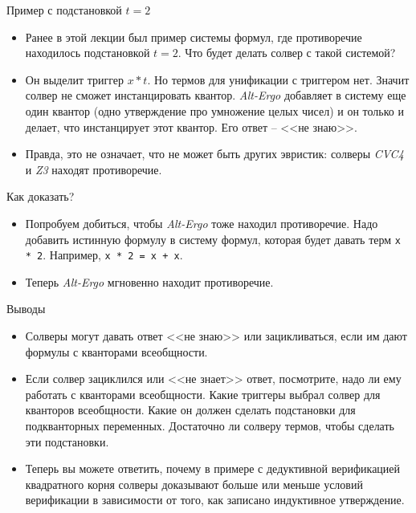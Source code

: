 \documentclass[hyperref={unicode=true}]{beamer}
\begin{document}
    \begin{frame}{Пример с подстановкой $t = 2$}
    \begin{itemize}
    \item
    Ранее в этой лекции был пример системы формул, где противоречие
    находилось подстановкой $t = 2$. Что будет делать солвер с такой системой?
    \item
    Он выделит триггер $x * t$. Но термов для унификации с триггером нет.
    Значит солвер не сможет инстанцировать квантор. \textsl{Alt-Ergo}
    добавляет в систему еще один квантор (одно утверждение про умножение
    целых чисел) и он только и делает, что инстанцирует этот квантор. Его
    ответ -- <<не знаю>>.
    \item
    Правда, это не означает, что не может быть других эвристик: солверы
    \textsl{CVC4} и \textsl{Z3} находят противоречие.
    \end{itemize}
    \end{frame}

    \begin{frame}{Как доказать?}
    \begin{itemize}
    \item
    Попробуем добиться, чтобы \textsl{Alt-Ergo} тоже находил противоречие.
    Надо добавить истинную формулу в систему формул, которая будет давать
    терм \texttt{x * 2}. Например, \texttt{x * 2 = x + x}.
    \item
    Теперь \textsl{Alt-Ergo} мгновенно находит противоречие.
    \end{itemize}
    \end{frame}

    \begin{frame}{Выводы}
    \begin{itemize}
    \item
    Солверы могут давать ответ <<не знаю>> или зацикливаться, если
    им дают формулы с кванторами всеобщности.
    \item
    Если солвер зациклился или <<не знает>> ответ, посмотрите,
    надо ли ему работать с кванторами всеобщности. Какие триггеры выбрал
    солвер для кванторов всеобщности. Какие он должен сделать подстановки
    для подкванторных переменных. Достаточно ли солверу термов, чтобы
    сделать эти подстановки.
    \item
    Теперь вы можете ответить, почему в примере с дедуктивной верификацией
    квадратного корня солверы доказывают больше или меньше
    условий верификации в зависимости от того, как записано
    индуктивное утверждение.
    \end{itemize}
    \end{frame}
\end{document}
